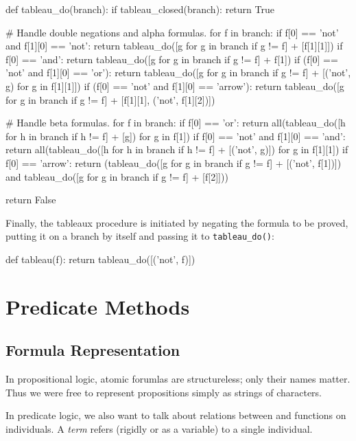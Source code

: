 \documentclass[a4paper,notitlepage]{scrartcl}
\begin{document}
\begin{code}
def tableau_do(branch):
    if tableau_closed(branch):
        return True

    # Handle double negations and alpha formulas.
    for f in branch:
        if f[0] == 'not' and f[1][0] == 'not':
            return tableau_do([g for g in branch if g != f] + [f[1][1]])
        if f[0] == 'and':
            return tableau_do([g for g in branch if g != f] + f[1])
        if (f[0] == 'not' and f[1][0] == 'or'):
            return tableau_do([g for g in branch if g != f] +
                [('not', g) for g in f[1][1]])
        if (f[0] == 'not' and f[1][0] == 'arrow'):
            return tableau_do([g for g in branch if g != f] +
                [f[1][1], ('not', f[1][2])])

    # Handle beta formulas.
    for f in branch:
        if f[0] == 'or':
            return all(tableau_do([h for h in branch if h != f] + [g])
                for g in f[1])
        if f[0] == 'not' and f[1][0] == 'and':
            return all(tableau_do([h for h in branch if h != f] + [('not', g)])
                for g in f[1][1])
        if f[0] == 'arrow':
            return (tableau_do([g for g in branch if g != f] + [('not', f[1])])
                and tableau_do([g for g in branch if g != f] + [f[2]]))

    return False
\end{code}

Finally, the tableaux procedure is initiated by negating the formula to be
proved, putting it on a branch by itself and passing it to
\texttt{tableau\_do()}:

\begin{code}
def tableau(f):
    return tableau_do([('not', f)])
\end{code}

\section{Predicate Methods}

\subsection{Formula Representation}
In propositional logic, atomic forumlas are structureless; only their
   names matter.
Thus we were free to represent propositions simply as strings of characters.

In predicate logic, we also want to talk about relations between and functions
   on individuals. 
A \emph{term} refers (rigidly or as a variable) to a single individual.
\end{document}
